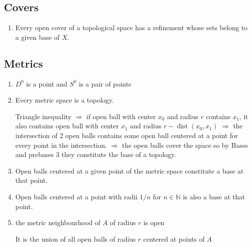 \documentclass{article}
\DeclareMathOperator{\dist}{dist}
\begin{document}
\subsection{Covers}
\begin{enumerate}
\item Every open cover of a topological space has a refinement whose sets belong to a given base of \(X\).
\end{enumerate}
\subsection{Metrics}
\begin{enumerate}
\item \(D^{0}\) is a point and \(S^{0}\) is a pair of points
\item Every metric space is a topology.

Triangle inequality \(\Longrightarrow\) if open ball with center \(x_{0}\) and radius \(r\) contains \(x_{1}\), it also contains open ball with center \(x_{1}\) and radius \(r-\dist(x_{0},x_{1})\) \(\Longrightarrow\) 
the intersection of 2 open balls contains some open ball centered at a point for every point in the intersection. \(\Longrightarrow\) the open balls cover the space so by \color{gray}Bases and prebases 3 \color{black} they constitute the base of a topology.
\item Open balls centered at a given point of the metric space constitute a base at that point.
\item Open balls centered at a point with radii \(1/n\) for \(n\in\mathbb{N}\) is also a base at that point.
\item the metric neighbourhood of \(A\) of radius \(r\) is open

It is the union of all open balls of radius \(r\) centered at points of \(A\)
\end{enumerate}
\end{document}
